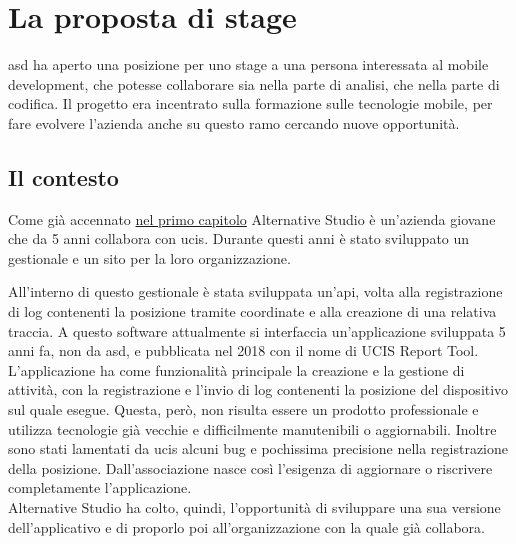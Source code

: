 
\section{La proposta di stage}

\acrlong{asd} ha aperto una posizione per uno stage a una persona interessata al mobile development, che potesse collaborare sia nella parte di analisi, che nella parte di codifica. Il progetto era incentrato sulla formazione sulle tecnologie mobile, per fare evolvere l'azienda anche su questo ramo cercando nuove opportunità.

\subsection{Il contesto}

Come già accennato {\hyperref[cap:introduzione]{nel primo capitolo}} Alternative Studio è un'azienda giovane che da 5 anni collabora con
\gls{ucis}. Durante questi anni è stato sviluppato un gestionale e un sito per la loro organizzazione.


All'interno di questo gestionale è stata sviluppata un'\acrshort{api}, volta alla registrazione di log contenenti la posizione tramite
coordinate e alla creazione di una relativa traccia. A questo software attualmente si interfaccia un'applicazione sviluppata 5 anni fa, non
da \acrlong{asd}, e pubblicata nel 2018 con il nome di UCIS Report Tool. L'applicazione ha come funzionalità principale la creazione e la
gestione di attività, con la registrazione e l'invio di log contenenti la posizione del dispositivo sul quale esegue. Questa, però, non
risulta essere un prodotto professionale e utilizza tecnologie già vecchie e difficilmente manutenibili o aggiornabili. Inoltre sono stati
lamentati da \gls{ucis} alcuni bug e pochissima precisione nella registrazione della posizione. Dall'associazione nasce così l'esigenza di aggiornare
o riscrivere completamente l'applicazione. \\
\noindent Alternative Studio ha colto, quindi, l'opportunità di sviluppare una sua versione dell'applicativo e di proporlo poi all'organizzazione con la quale già collabora.

